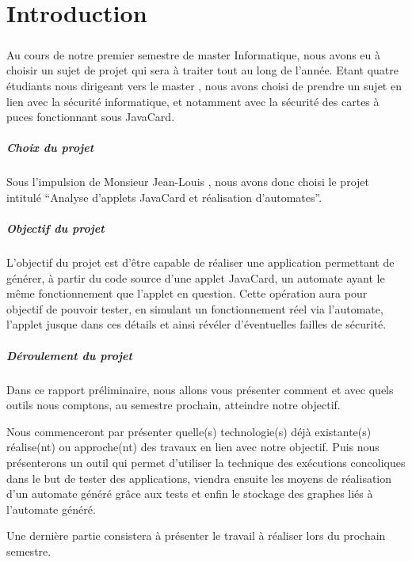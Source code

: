 \chapter*{Introduction}

\paragraph{}
Au cours de notre premier semestre de master Informatique, nous avons eu à choisir un sujet de projet qui sera à traiter tout au long de l'année.
Etant quatre étudiants nous dirigeant vers le master , nous avons choisi de prendre un sujet en lien avec la sécurité informatique, et notamment avec la sécurité des cartes à puces fonctionnant sous JavaCard.

\paragraph{Choix du projet}
Sous l'impulsion de Monsieur Jean-Louis , nous avons donc choisi le projet intitulé ``Analyse d'applets JavaCard et réalisation d'automates''.

\paragraph{Objectif du projet}
L'objectif du projet est d'être capable de réaliser une application permettant de générer, à partir du code source d'une applet JavaCard, un automate ayant le même fonctionnement que l'applet en question. Cette opération aura pour objectif de pouvoir tester, en simulant un fonctionnement réel via l'automate, l'applet jusque dans ces détails et ainsi révéler d'éventuelles failles de sécurité.

\paragraph{Déroulement du projet}
Dans ce rapport préliminaire, nous allons vous présenter comment et avec quels outils nous comptons, au semestre prochain, atteindre notre objectif.

Nous commenceront par présenter quelle(s) technologie(s) déjà existante(s) réalise(nt) ou approche(nt) des travaux en lien avec notre objectif. Puis nous présenterons un outil qui permet d'utiliser la technique des exécutions concoliques dans le but de tester des applications, viendra ensuite les moyens de réalisation d'un automate généré grâce aux tests et enfin le stockage des graphes liés à l'automate généré.

Une dernière partie consistera à présenter le travail à réaliser lors du prochain semestre.